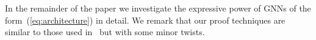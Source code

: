 In the remainder of the paper we investigate the expressive power of GNNs of the form~(\ref{eq:architecture}) in detail. We remark that our proof techniques are similar to those used in~\cite{grohewl} but with some minor twists.



